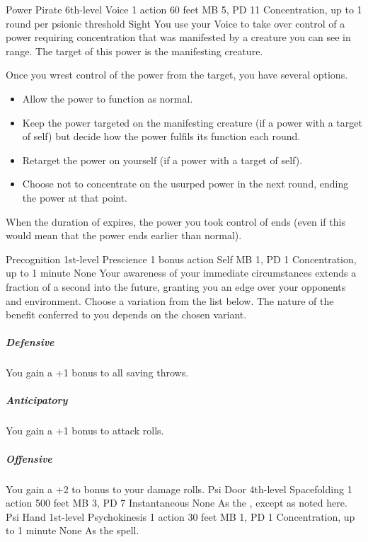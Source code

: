 \DndPowerHeader%
    {Power Pirate\label{pwr:power-pirate}}
    {6th-level Voice}
    {1 action}
    {60 feet}
    {MB 5, PD 11}
    {Concentration, up to 1 round per psionic threshold}
    {Sight}
You use your Voice to take over control of a power
requiring concentration that was manifested
by a creature you can see in range.
The target of this power is the manifesting creature.

Once you wrest control of the power from the target,
you have several options.
\begin{itemize}
\item Allow the power to function as normal.
\item Keep the power targeted on the manifesting creature
        (if a power with a target of self) but decide how
        the power fulfils its function each round.
\item Retarget the power on yourself
        (if a power with a target of self).
\item Choose not to concentrate on the usurped power
          in the next round, ending the power at that point.
\end{itemize}

When the duration of  expires,
the power you took control of ends
(even if this would mean that the power ends earlier than normal).

\DndPowerHeader%
    {Precognition\label{pwr:precognition}}
    {1st-level Prescience}
    {1 bonus action}
    {Self}
    {MB 1, PD 1}
    {Concentration, up to 1 minute}
    {None}
Your awareness of your immediate circumstances extends
a fraction of a second into the future,
granting you an edge over your opponents and environment.
Choose a variation from the list below.
The nature of the benefit conferred to you
depends on the chosen variant.

\subparagraph{Defensive}
  You gain a +1 bonus to all saving throws.

\subparagraph{Anticipatory}
  You gain a +1 bonus to attack rolls.

\subparagraph{Offensive}
  You gain a +2 to bonus to your damage rolls.
\DndPowerHeader%
    {Psi Door\label{pwr:psi-door}}
    {4th-level Spacefolding}
    {1 action}
    {500 feet}
    {MB 3, PD 7}
    {Instantaneous}
    {None}
As the , except as
noted here.
\DndPowerHeader%
    {Psi Hand\label{pwr:psi-hand}}
    {1st-level Psychokinesis}
    {1 action}
    {30 feet}
    {MB 1, PD 1}
    {Concentration, up to 1 minute}
    {None}
As the  spell.

